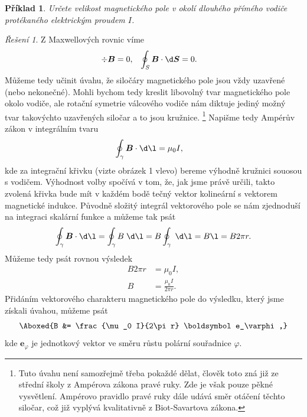 \documentclass[11pt,a4paper]{report}
\renewcommand{\vec}{\boldsymbol}
\theoremstyle{theorem}
\newtheorem{example}{Příklad}
\theoremstyle{remark}
\newtheorem*{solution}{Řešení}
\theoremstyle{definition}
\begin{document}
		\begin{example}
			\label{1}
			Určete velikost magnetického pole v okolí dlouhého přímého vodiče protékaného elektrickým proudem $I$.
		\end{example}
		\begin{solution}
			Z Maxwellových rovnic víme
			\begin{align*}
				\div \vec B &= 0,
			&
				\oint_S \vec B \cdot \d \vec S &= 0.
			\end{align*}
			Můžeme tedy učinit úvahu, že siločáry magnetického pole jsou vždy uzavřené (nebo nekonečné). Mohli bychom tedy kreslit libovolný tvar magnetického pole okolo vodiče, ale rotační symetrie válcového vodiče nám diktuje jediný možný tvar takovýchto uzavřených siločar a to jsou kružnice.%
				\footnote{Tuto úvahu není samozřejmě třeba pokaždé dělat, člověk toto zná již ze střední školy z Ampérova zákona pravé ruky. Zde je však pouze pěkné vysvětlení. Ampérovo pravidlo pravé ruky dále udává směr otáčení těchto siločar, což již vyplývá kvalitativně z Biot-Savartova zákona.}
			Napišme tedy Ampérův zákon v integrálním tvaru
			\begin{align*}
				\oint_\gamma \vec B \cdot \d \vec \l &= \mu_0 I,
			\end{align*}
			kde za integrační křivku (vizte obrázek 1 vlevo) bereme výhodně kružnici souosou s vodičem. Výhodnost volby spočívá v tom, že, jak jsme právě určili, takto zvolená křivka bude mít v každém bodě tečný vektor kolineární s vektorem magnetické indukce. Původně složitý integrál vektorového pole se nám zjednoduší na integraci skalární funkce a můžeme tak psát
			\begin{align*}
				\oint_\gamma \vec B \cdot \d \vec \l = \oint_\gamma B \; \d \l = B \oint_\gamma \; \d \l = B\l = B 2\pi r.
			\end{align*}
			Můžeme tedy psát rovnou výsledek
			\begin{align*}
				B 2 \pi r &= \mu_0 I,
			\\
				B &= \frac{\mu_0 I}{2\pi r}.
			\end{align*}
			Přidáním vektorového charakteru magnetického pole do výsledku, který jsme získali úvahou, můžeme psát
			\begin{align*}
				\Aboxed{B &= \frac{\mu_0 I}{2\pi r} \vec e_\varphi,}
			\end{align*}
			kde $\vec e_\varphi$ je jednotkový vektor ve směru růstu polární souřadnice $\varphi$.
		\end{solution}
		
\end{document}
